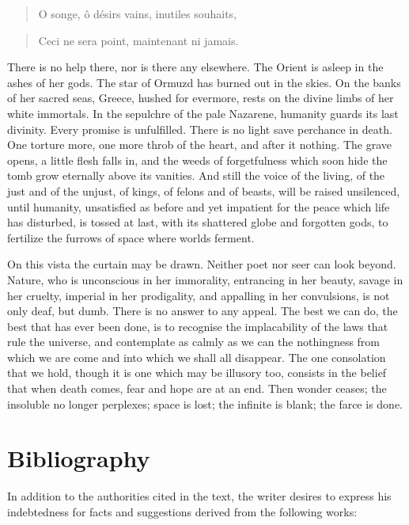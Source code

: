 \documentclass[]{book}
\begin{document}
\begin{quote}
O songe, ô désirs vains, inutiles souhaits,
\end{quote}

\begin{quote}
Ceci ne sera point, maintenant ni jamais.
\end{quote}

There is no help there, nor is there any elsewhere. The Orient is asleep
in the ashes of her gods. The star of Ormuzd has burned out in the
skies. On the banks of her sacred seas, Greece, hushed for evermore,
rests on the divine limbs of her white immortals. In the sepulchre of
the pale Nazarene, humanity guards its last divinity. Every promise is
unfulfilled. There is no light save perchance in death. One torture
more, one more throb of the heart, and after it nothing. The grave
opens, a little flesh falls in, and the weeds of forgetfulness which
soon hide the tomb grow eternally above its vanities. And still the
voice of the living, of the just and of the unjust, of kings, of felons
and of beasts, will be raised unsilenced, until humanity, unsatisfied as
before and yet impatient for the peace which life has disturbed, is
tossed at last, with its shattered globe and forgotten gods, to
fertilize the furrows of space where worlds ferment.

On this vista the curtain may be drawn. Neither poet nor seer can look
beyond. Nature, who is unconscious in her immorality, entrancing in her
beauty, savage in her cruelty, imperial in her prodigality, and
appalling in her convulsions, is not only deaf, but dumb. There is no
answer to any appeal. The best we can do, the best that has ever been
done, is to recognise the implacability of the laws that rule the
universe, and contemplate as calmly as we can the nothingness from which
we are come and into which we shall all disappear. The one consolation
that we hold, though it is one which may be illusory too, consists in
the belief that when death comes, fear and hope are at an end. Then
wonder ceases; the insoluble no longer perplexes; space is lost; the
infinite is blank; the farce is done.

\chapter*{Bibliography}\label{bibliography}

In addition to the authorities cited in the text, the writer desires to
express his indebtedness for facts and suggestions derived from the
following works:
\end{document}
